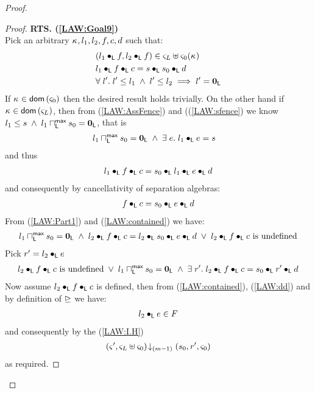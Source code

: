 \begin{lemma}[]
\begin{proof}
\begin{proof}
\noindent\textbf{RTS. (\ref{LAW:Goal9})}\\
Pick an arbitrary $\kappa_{}, l_1, l_2, f, c, d$ such that:
%
\begin{align}
	& (l_1 \bullet_{\textsf{L}} f, l_2 \bullet_{\textsf{L}} f) \in \varsigma_{L} \uplus \varsigma_{0}(\kappa_{}) \label{LAW:Ass16}\\
	& l_1 \bullet_{\textsf{L}} f \bullet_{\textsf{L}} c = s \bullet_{\textsf{L}} s_0 \bullet_{\textsf{L}} d \label{LAW:Ass17}\\
	& \forall\; l'.\; l' \leq l_1 \;\land\; l' \leq l_2 \implies l' = \mathbf{0}_{\textsf{L}}
\end{align}
%
If $\kappa_{} \in \textsf{dom}\left( \varsigma_{0} \right)$ then the desired result holds trivially. On the other hand if $\kappa_{} \in \textsf{dom}\left( \varsigma_{L} \right)$, then from (\ref{LAW:AssFence}) and ((\ref{LAW:sfence}) we know $l_1 \leq s \;\land\; l_1 \sqcap_{\textsf{L}}^{\textsf{max}} s_0 = \mathbf{0}_{\textsf{L}}$, that is 
%
\begin{align}
	& l_1 \sqcap_{\textsf{L}}^{\textsf{max}} s_0 = \mathbf{0}_{\textsf{L}} \;\land\; \exists\; e.\; l_1 \bullet_{\textsf{L}} e = s \label{LAW:contained}
\end{align}
%
and thus
%
\begin{align}
	l_1 \bullet_{\textsf{L}} f \bullet_{\textsf{L}} c = s_0 \bullet_{\textsf{L}} l_1 \bullet_{\textsf{L}} e \bullet_{\textsf{L}} d \nonumber
\end{align}
%
and consequently by cancellativity of separation algebras:
%
\begin{align}
	f \bullet_{\textsf{L}} c = s_0 \bullet_{\textsf{L}} e \bullet_{\textsf{L}} d \label{LAW:Part1}
\end{align}
%
From (\ref{LAW:Part1}) and (\ref{LAW:contained}) we have:
%
\begin{align}
	l_1 \sqcap_{\textsf{L}}^{\textsf{max}} s_0 = \mathbf{0}_{\textsf{L}} \;\land\;  l_2 \bullet_{\textsf{L}} f \bullet_{\textsf{L}} c = l_2 \bullet_{\textsf{L}} s_0 \bullet_{\textsf{L}} e \bullet_{\textsf{L}} d \;\lor\; l_2 \bullet_{\textsf{L}} f \bullet_{\textsf{L}} c \text{ is undefined} \nonumber
\end{align}
%
Pick $r' = l_2 \bullet_{\textsf{L}} e$
%
\begin{align}
	l_2 \bullet_{\textsf{L}} f \bullet_{\textsf{L}} c \text{ is undefined} \;\lor\; l_1 \sqcap_{\textsf{L}}^{\textsf{max}} s_0 = \mathbf{0}_{\textsf{L}} \;\land\; \exists\; r'.\; l_2 \bullet_{\textsf{L}} f \bullet_{\textsf{L}} c = s_0 \bullet_{\textsf{L}} r' \bullet_{\textsf{L}} d \label{LAW:Part2}
\end{align}
%
Now assume $l_2 \bullet_{\textsf{L}} f \bullet_{\textsf{L}} c$ is defined, then from (\ref{LAW:contained}), (\ref{LAW:dd}) and by definition of $\unrhd$ we have:
%
\begin{align}
	l_2 \bullet_{\textsf{L}} e \in F \label{LAW:fenced}
\end{align}
%
and consequently by the (\ref{LAW:I.H})
%
\begin{align}
	\left(\varsigma_{}', \varsigma_{L} \uplus \varsigma_{0}\right) \!\downarrow_{(m-1)} \left(s_0, r', \varsigma_{0}\right)
\end{align}
as required.
\renewcommand{\qed}{}
\end{proof}


\end{proof}
\end{lemma}

